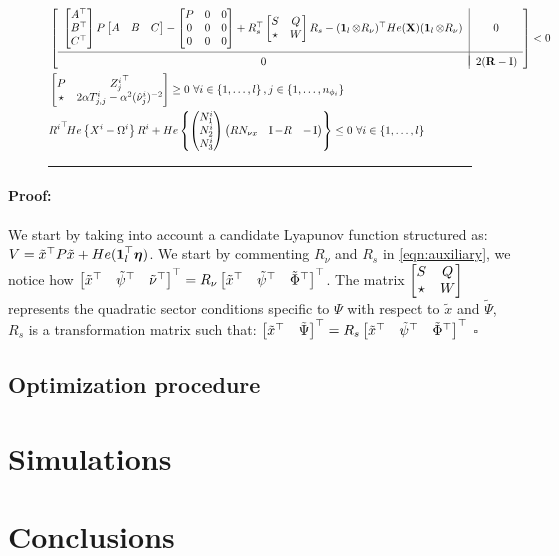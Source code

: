 \documentclass{ifacconf}
\theoremstyle{plain}
\newenvironment{proof}{\paragraph*{Proof:}}{\hfill$\square$}
\begin{document}
\begin{figure}
\begin{align}\label{eqn:lyapunov}
  &\left[\begin{matrix}
  \begin{array}{c|c}
  \left[\begin{matrix}\relax{A}^\top\\
  \relax{B}^\top\\
  C^\top
  \end{matrix}\right] P \left[\begin{matrix}\relax{A} & \relax{B} & C\end{matrix}\right] - \left[\begin{matrix}
  P & 0 & 0\\
  0 & 0 & 0\\
  0 & 0 & 0
  \end{matrix}\right] + R_s^\top \left[\begin{matrix}
    S & Q\\
    \star & W
  \end{matrix}\right]  R_s - (\operatorname{\mathbf{1}}_l \otimes R_{\nu})^\top He({\bf{X}}) (\operatorname{\mathbf{1}}_l \otimes R_{\nu}) \hspace{.1em}& 0\\[1.5em]
\hline \\[-0.9em]
  0 & \hspace{.1em} 2 ({\bf{R}} - \operatorname{I})
  \end{array}\end{matrix}\right] < 0\\
  &\left[\begin{matrix}
    P & {Z_j^i}^\top\\
    \star & 2 \alpha T^i_{j,j} - \alpha^2 (\hat{\nu}_j^i)^{-2}
  \end{matrix}\right] \geq 0 \ \forall i \in \left\{ 1, \dots, l \right\}, j \in \left\{ 1, \dots, n_{\phi_i} \right\} \label{eqn:inclusion}\\
  &{R^i}^\top\! He\left\{X^i - \Omega^i\right\} R^i + He\left\{ \left(\begin{matrix}N^i_1\\ N^i_2\\ N^i_3\end{matrix}\right) \left(\begin{matrix}R N_{\nu x} & \operatorname{I} - R & -\operatorname{I}\end{matrix}\right)\right\} \leq 0 \ \forall i \in \left\{ 1, \dots, l \right\} \label{eqn:finsler_constraint} 
\end{align}
\vspace{.5em}
\hrule
\end{figure}

\begin{proof} We start by taking into account a candidate Lyapunov function structured as: $V = \tilde{x}^\top P \tilde{x} + He(\operatorname{\mathbf{1}}_l^\top\!\boldsymbol{\eta})$. We start by commenting $R_{\nu}$ and $R_s$ in \eqref{eqn:auxiliary}, we notice how $\left[\begin{matrix}\tilde{x}^\top & \tilde{\psi}^\top & \tilde{\nu}^\top\end{matrix}\right]^\top = R_{\nu} \left[\begin{matrix}\tilde{x}^\top & \tilde{\psi}^\top & \tilde{\Phi}^\top\end{matrix}\right]^\top$. The matrix $\left[\begin{matrix}S & Q\\ \star & W\end{matrix}\right]$ represents the quadratic sector conditions specific to $\Psi$ with respect to $\tilde{x}$ and $\tilde{\Psi}$, $R_s$ is a transformation matrix such that: $\left[\begin{matrix}\tilde{x}^\top & \tilde{\Psi}\end{matrix}\right]^\top = R_s \left[\begin{matrix}\tilde{x}^\top & \tilde{\psi}^\top & \tilde{\Phi}^\top\end{matrix}\right]^\top$
\end{proof}
\subsection{Optimization procedure}

\section{Simulations}

\section{Conclusions}

%

\end{document}
